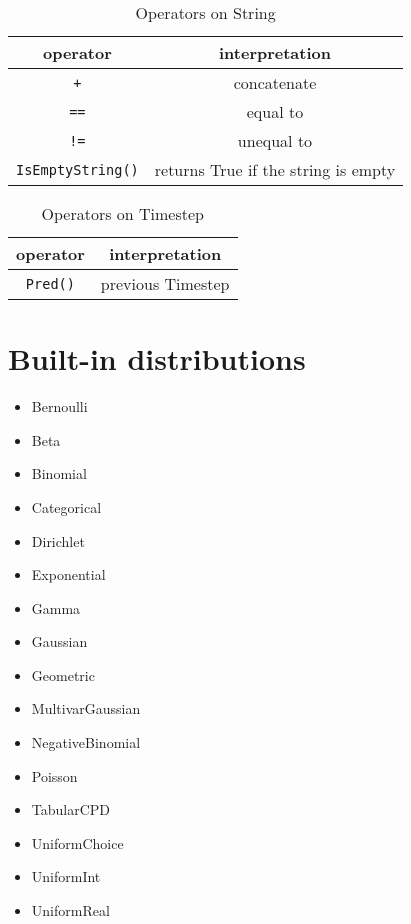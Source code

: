 \documentclass[12pt]{article}
\begin{document}
\begin{table}[h]
\centering
\caption{Operators on String}
\begin{tabular}{ c c }
\toprule 
operator & interpretation \\
\midrule
{\tt +} & concatenate \\ 
{\tt ==} & equal to \\
{\tt !=} & unequal to \\ 
\verb|IsEmptyString()| & returns True if the string is empty\\
\bottomrule
\end{tabular}
\end{table}

\begin{table}[h]
\centering
\caption{Operators on Timestep}
\begin{tabular}{ c c }
\toprule 
operator & interpretation \\
\midrule
\verb|Pred()| & previous Timestep\\
\bottomrule
\end{tabular}
\end{table}



\section{Built-in distributions}
\begin{itemize}
\item Bernoulli
\item Beta
\item Binomial
\item Categorical
\item Dirichlet
\item Exponential
\item Gamma
\item Gaussian
\item Geometric
\item MultivarGaussian
\item NegativeBinomial
\item Poisson
\item TabularCPD
\item UniformChoice
\item UniformInt
\item UniformReal
\end{itemize}
\end{document}
